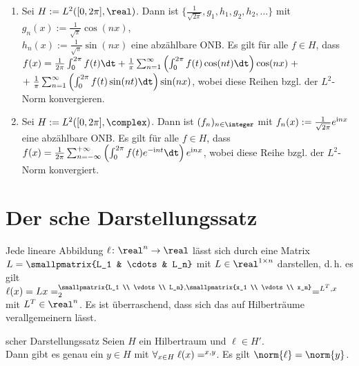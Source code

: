 \begin{Bsp}
    \begin{enumerate}[label=\emph{(\alph*)}]
        \item
        Sei $H := L^2([0, 2\pi], \real)$.
        Dann ist $\{\frac{1}{\sqrt{2\pi}}, g_1, h_1, g_2, h_2, \dotsc\}$
        mit $g_n(x) := \frac{1}{\sqrt{\pi}} \cos(nx)$,\\
        $h_n(x) := \frac{1}{\sqrt{\pi}} \sin(nx)$
        eine abzählbare ONB.
        Es gilt für alle $f \in H$, dass\\
        $f(x) = \frac{1}{2\pi} \int_0^{2\pi} f(t)\dt +
        \frac{1}{\pi} \sum_{n=1}^\infty \left(\int_0^{2\pi} f(t)\cos(nt)\dt\right) \cos(nx) \;+$\\
        $+\; \frac{1}{\pi} \sum_{n=1}^\infty \left(\int_0^{2\pi} f(t)\sin(nt)\dt\right) \sin(nx)$,
        wobei diese Reihen bzgl. der $L^2$-Norm konvergieren.

        \item
        Sei $H := L^2([0, 2\pi], \complex)$.
        Dann ist $(f_n)_{n \in \integer}$ mit $f_n(x) := \frac{1}{\sqrt{2\pi}} e^{\mathrm{i} nx}$
        eine abzählbare ONB.
        Es gilt für alle $f \in H$, dass
        $f(x) = \frac{1}{2\pi} \sum_{n=-\infty}^{+\infty}
        \left(\int_0^{2\pi} f(t) e^{-\iu nt} \dt\right) e^{\iu nx}$,
        wobei diese Reihe bzgl. der $L^2$-Norm konvergiert.
    \end{enumerate}
\end{Bsp}

\pagebreak

\section{%
    Der sche Darstellungssatz%
}

\begin{Bem}
    Jede lineare Abbildung $\ell\colon \real^n \rightarrow \real$ lässt sich durch eine
    Matrix $L = \smallpmatrix{L_1 & \cdots & L_n}$ mit $L \in \real^{1 \times n}$ darstellen,
    d.\,h. es gilt $\ell(x) = Lx = \sp{\smallpmatrix{L_1 \\ \vdots \\ L_n},
    \smallpmatrix{x_1 \\ \vdots \\ x_n}}_2 = \sp{L^T, x}$ mit $L^T \in \real^n$.
    Es ist überraschend, dass sich das auf Hilberträume verallgemeinern lässt.
\end{Bem}

\begin{Satz}{scher Darstellungssatz}
    Seien $H$ ein Hilbertraum und $\ell \in H'$.\\
    Dann gibt es genau ein $y \in H$ mit $\forall_{x \in H}\; \ell(x) = \sp{x, y}$.
    Es gilt $\norm{\ell} = \norm{y}$.
\end{Satz}

